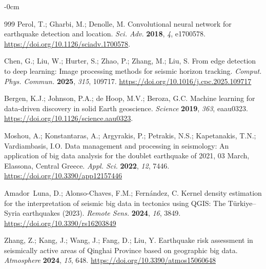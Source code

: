 \documentclass[data,article,accept,pdftex,moreauthors]{Definitions/mdpi}
\begin{document}
\begin{adjustwidth}{-\extralength}{0cm}
\begin{thebibliography}{999}
Perol, T.; Gharbi, M.; Denolle, M. Convolutional neural network for earthquake detection and location. %
 \emph{Sci. Adv.} \textbf{2018}, \emph{4}, e1700578. %
 \url{https://doi.org/10.1126/sciadv.1700578}.

Chen, G.; Liu, W.; Hurter, S.; Zhao, P.; Zhang, M.; Liu, S. From edge detection to deep learning: Image processing methods for seismic horizon tracking. \emph{Comput. Phys. Commun.} \textbf{2025}, \emph{315}, 109717. \url{https://doi.org/10.1016/j.cpc.2025.109717}

Bergen, K.J.; Johnson, P.A.; de Hoop, M.V.; Beroza, G.C. Machine learning for data-driven discovery in solid Earth geoscience. \emph{Science} \textbf{2019}, \emph{363}, eaau0323. \url{https://doi.org/10.1126/science.aau0323}.

Moshou, A.; Konstantaras, A.; Argyrakis, P.; Petrakis, N.S.; Kapetanakis, T.N.; Vardiambasis, I.O. Data management and processing in seismology: An application of big data analysis for the doublet earthquake of 2021, 03 March, Elassona, Central Greece. \emph{Appl. Sci.} \textbf{2022}, \emph{12}, 7446. \url{https://doi.org/10.3390/app12157446}

Amador~Luna, D.; Alonso-Chaves, F.M.; Fern{\'a}ndez, C. Kernel density estimation for the interpretation of seismic big data in tectonics using QGIS: The T\"{u}rkiye--Syria earthquakes (2023). \emph{Remote Sens.} \textbf{2024}, \emph{16}, 3849. \url{https://doi.org/10.3390/rs16203849}

Zhang, Z.; Kang, J.; Wang, J.; Fang, D.; Liu, Y. Earthquake risk assessment in seismically active areas of Qinghai Province based on geographic big data. \emph{Atmosphere} \textbf{2024}, \emph{15}, 648. \url{https://doi.org/10.3390/atmos15060648}


\end{thebibliography}
\end{adjustwidth}
\end{document}

